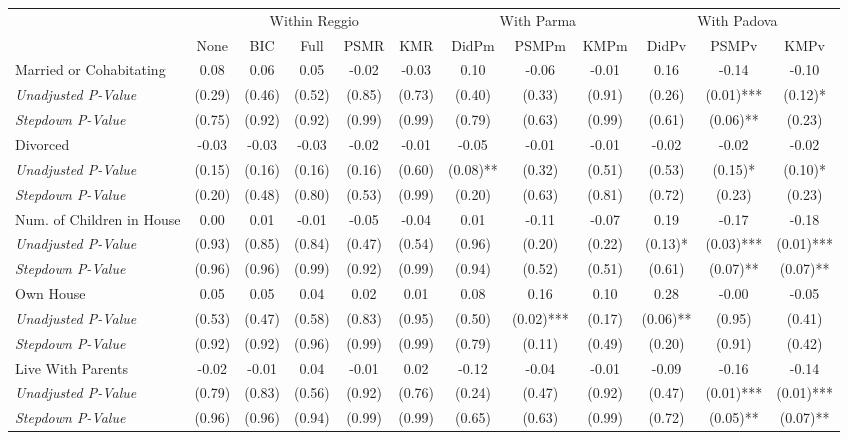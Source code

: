 \begin{tabular}{l c c c c c c c c c c c}
\toprule
& \multicolumn{5}{c}{Within Reggio} & \multicolumn{3}{c}{With Parma} & \multicolumn{3}{c}{With Padova} \\\cmidrule(lr){2-6} \cmidrule(lr){7-9} \cmidrule(lr){10-12}
 & None & BIC & Full & PSMR & KMR & DidPm & PSMPm & KMPm & DidPv & PSMPv & KMPv \\
\midrule
Married or Cohabitating & 0.08 & 0.06 & 0.05 & -0.02 & -0.03 & 0.10 & -0.06 & -0.01 & 0.16 & -0.14 & -0.10 \\
\quad \textit{Unadjusted P-Value} & (0.29) & (0.46) & (0.52) & (0.85) & (0.73) & (0.40) & (0.33) & (0.91) & (0.26) & (0.01)*** & (0.12)* \\
\quad \textit{Stepdown P-Value} & (0.75) & (0.92) & (0.92) & (0.99) & (0.99) & (0.79) & (0.63) & (0.99) & (0.61) & (0.06)** & (0.23) \\
Divorced & -0.03 & -0.03 & -0.03 & -0.02 & -0.01 & -0.05 & -0.01 & -0.01 & -0.02 & -0.02 & -0.02 \\
\quad \textit{Unadjusted P-Value} & (0.15) & (0.16) & (0.16) & (0.16) & (0.60) & (0.08)** & (0.32) & (0.51) & (0.53) & (0.15)* & (0.10)* \\
\quad \textit{Stepdown P-Value} & (0.20) & (0.48) & (0.80) & (0.53) & (0.99) & (0.20) & (0.63) & (0.81) & (0.72) & (0.23) & (0.23) \\
Num. of Children in House & 0.00 & 0.01 & -0.01 & -0.05 & -0.04 & 0.01 & -0.11 & -0.07 & 0.19 & -0.17 & -0.18 \\
\quad \textit{Unadjusted P-Value} & (0.93) & (0.85) & (0.84) & (0.47) & (0.54) & (0.96) & (0.20) & (0.22) & (0.13)* & (0.03)*** & (0.01)*** \\
\quad \textit{Stepdown P-Value} & (0.96) & (0.96) & (0.99) & (0.92) & (0.99) & (0.94) & (0.52) & (0.51) & (0.61) & (0.07)** & (0.07)** \\
Own House & 0.05 & 0.05 & 0.04 & 0.02 & 0.01 & 0.08 & 0.16 & 0.10 & 0.28 & -0.00 & -0.05 \\
\quad \textit{Unadjusted P-Value} & (0.53) & (0.47) & (0.58) & (0.83) & (0.95) & (0.50) & (0.02)*** & (0.17) & (0.06)** & (0.95) & (0.41) \\
\quad \textit{Stepdown P-Value} & (0.92) & (0.92) & (0.96) & (0.99) & (0.99) & (0.79) & (0.11) & (0.49) & (0.20) & (0.91) & (0.42) \\
Live With Parents & -0.02 & -0.01 & 0.04 & -0.01 & 0.02 & -0.12 & -0.04 & -0.01 & -0.09 & -0.16 & -0.14 \\
\quad \textit{Unadjusted P-Value} & (0.79) & (0.83) & (0.56) & (0.92) & (0.76) & (0.24) & (0.47) & (0.92) & (0.47) & (0.01)*** & (0.01)*** \\
\quad \textit{Stepdown P-Value} & (0.96) & (0.96) & (0.94) & (0.99) & (0.99) & (0.65) & (0.63) & (0.99) & (0.72) & (0.05)** & (0.07)** \\
\bottomrule
\end{tabular}
